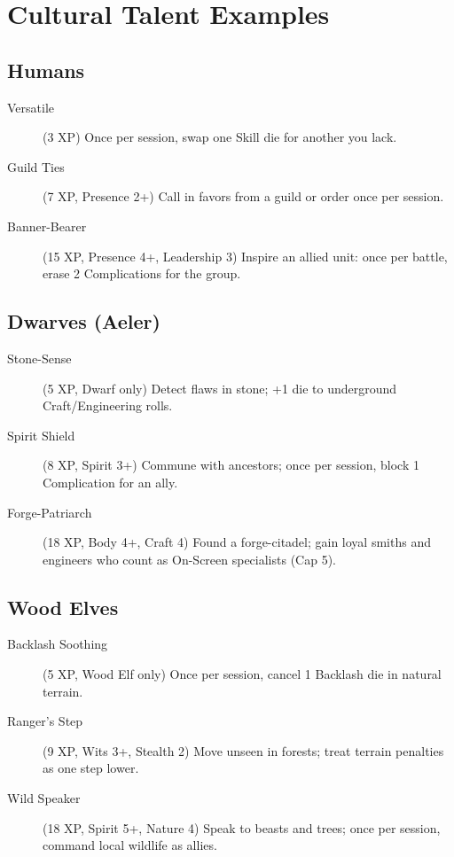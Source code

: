 \section{Cultural Talent Examples}

\subsection{Humans}

\begin{description}
\item[Versatile] (3 XP) Once per session, swap one Skill die for another you lack.
\item[Guild Ties] (7 XP, Presence 2+) Call in favors from a guild or order once per session.
\item[Banner-Bearer] (15 XP, Presence 4+, Leadership 3) Inspire an allied unit: once per battle, erase 2 Complications for the group.
\end{description}

\subsection{Dwarves (Aeler)}

\begin{description}
\item[Stone-Sense] (5 XP, Dwarf only) Detect flaws in stone; +1 die to underground Craft/Engineering rolls.
\item[Spirit Shield] (8 XP, Spirit 3+) Commune with ancestors; once per session, block 1 Complication for an ally.
\item[Forge-Patriarch] (18 XP, Body 4+, Craft 4) Found a forge-citadel; gain loyal smiths and engineers who count as On-Screen specialists (Cap 5).
\end{description}

\subsection{Wood Elves}

\begin{description}
\item[Backlash Soothing] (5 XP, Wood Elf only) Once per session, cancel 1 Backlash die in natural terrain.
\item[Ranger's Step] (9 XP, Wits 3+, Stealth 2) Move unseen in forests; treat terrain penalties as one step lower.
\item[Wild Speaker] (18 XP, Spirit 5+, Nature 4) Speak to beasts and trees; once per session, command local wildlife as allies.
\end{description}

